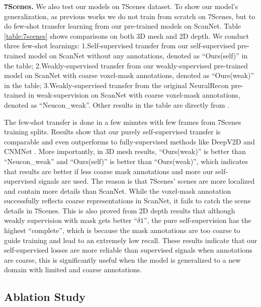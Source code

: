 \noindent
\textbf{7Scenes.} We also test our models on 7Scenes dataset. To show our model's generalization, as previous works \cite{neucon} we do not train from scratch on 7Scenes, but to do few-shot transfer learning from our pre-trained models on ScanNet. Table \ref{table:7scenes} shows comparisons on both 3D mesh and 2D depth. We conduct three few-shot learnings: 1.Self-supervised transfer from our self-supervised pre-trained model on ScanNet without any annotations, denoted as ``Ours(self)'' in the table; 2.Weakly-supervised transfer from our weakly-supervised pre-trained model on ScanNet with coarse voxel-mask annotations, denoted as ``Ours(weak)'' in the table; 3.Weakly-supervised transfer from the original NeuralRecon pre-trained in weak-supervision on ScanNet with coarse voxel-mask annotations, denoted as ``Neucon\_weak''. Other results in the table are directly from \cite{neucon}. 

The few-shot transfer is done in a few minutes with few frames from 7Scenes training splits. Results show that our purely self-supervised transfer is comparable and even outperforms to fully-supervised methods like DeepV2D \cite{deepv2d} and CNMNet \cite{CNMNet}. More importantly, in 3D mesh results, ``Ours(weak)'' is better than ``Neucon\_weak'' and ``Ours(self)'' is better than ``Ours(weak)'', which indicates that results are better if less coarse mask annotations and more our self-supervised signals are used. The reason is that 7Scenes' scenes are more localized and contain more details than ScanNet. While the voxel-mask annotation successfully reflects coarse representations in ScanNet, it fails to catch the scene details in 7Scenes. This is also proved from 2D depth results that although weakly supervision with mask gets better ``$\delta1$'', the pure self-supervision has the highest ``complete'', which is because the mask annotations are too coarse to guide training and lead to an extremely low recall. These results indicate that our self-supervised losses are more reliable than supervised signals when annotations are coarse, this is significantly useful when the model is generalized to a new domain with limited and coarse annotations. 

\subsection{Ablation Study}


